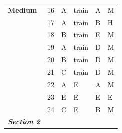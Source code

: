 \documentclass[pageno]{jpaper}
\newcommand{\textbi}[1]{\textbf{\textit{#1}}}
\begin{document}
\begin{table}[]
\begin{tabular}{@{}llllll@{}}
\textbf{Medium}         & 16                                  & A                                          & train                                       & A                                           & M                                       \\
\textbf{}               & 17                                  & A                                          & train                                       & B                                           & H                                       \\
\textbf{}               & 18                                  & B                                          & train                                       & E                                           & M                                       \\
\textbf{}               & 19                                  & A                                          & train                                       & D                                           & M                                       \\
\textbf{}               & 20                                  & B                                          & train                                       & D                                           & M                                       \\
\textbf{}               & 21                                  & C                                          & train                                       & D                                           & M                                       \\
\textbf{}               & 22                                  & A                                          & E                                           & A                                           & M                                       \\
\textbf{}               & 23                                  & E                                          & E                                           & E                                           & E                                       \\
\textbf{}               & 24                                  & C                                          & E                                           & B                                           & M                                       \\ \midrule
\textbi{Section 2}      &                                     &                                            &                                             &                                             &                                         \\ \midrule

\end{tabular}
\end{table}
\end{document}
